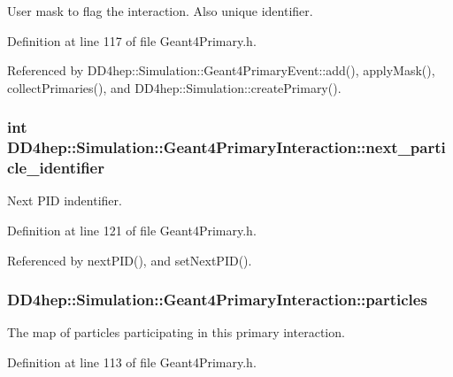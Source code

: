 User mask to flag the interaction. Also unique identifier. 

Definition at line 117 of file Geant4Primary.h.

Referenced by DD4hep::Simulation::Geant4PrimaryEvent::add(), applyMask(), collectPrimaries(), and DD4hep::Simulation::createPrimary().\hypertarget{class_d_d4hep_1_1_simulation_1_1_geant4_primary_interaction_a75a39b787b9c354fd958569f316a3023}{
\subsubsection[{next\_\-particle\_\-identifier}]{\setlength{\rightskip}{0pt plus 5cm}int {\bf DD4hep::Simulation::Geant4PrimaryInteraction::next\_\-particle\_\-identifier}}}
\label{class_d_d4hep_1_1_simulation_1_1_geant4_primary_interaction_a75a39b787b9c354fd958569f316a3023}


Next PID indentifier. 

Definition at line 121 of file Geant4Primary.h.

Referenced by nextPID(), and setNextPID().\hypertarget{class_d_d4hep_1_1_simulation_1_1_geant4_primary_interaction_af8c7d724dc7792108c26c6fe93d7bf61}{
\subsubsection[{particles}]{ {\bf DD4hep::Simulation::Geant4PrimaryInteraction::particles}}}
\label{class_d_d4hep_1_1_simulation_1_1_geant4_primary_interaction_af8c7d724dc7792108c26c6fe93d7bf61}


The map of particles participating in this primary interaction. 

Definition at line 113 of file Geant4Primary.h.

